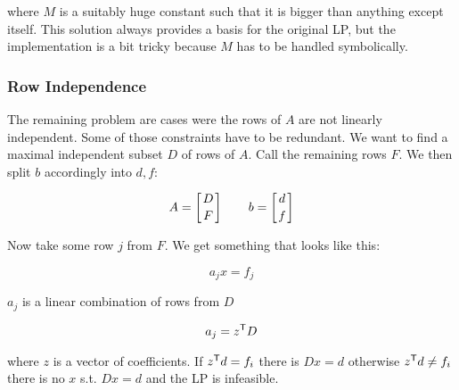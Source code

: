 where $M$ is a suitably huge constant such that it is bigger than anything except itself. This solution always provides a basis for the original LP, but the implementation is a bit tricky because $M$ has to be handled symbolically.

\subsubsection*{Row Independence}

The remaining problem are cases were the rows of $A$ are not linearly independent. Some of those constraints have to be redundant. We want to find a maximal independent subset $D$ of rows of $A$. Call the remaining rows $F$. We then split $b$ accordingly into $d,f$:

\[A=\left[ D \atop F\right] \qquad b = \left[d\atop f\right]\]

Now take some row $j$ from $F$. We get something that looks like this:

\[a_jx=f_j\]

$a_j$ is a linear combination of rows from $D$

\[a_j={z}^\text{\upshape \sffamily T} D\]

where $z$ is a vector of coefficients. If ${z}^\text{\upshape \sffamily T} d = f_i$ there is $Dx=d$ otherwise ${z}^\text{\upshape \sffamily T} d \neq f_i$ there is no $x$ s.t. $Dx=d$ and the LP is infeasible.